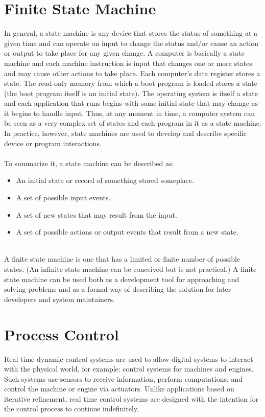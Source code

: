 \documentclass{article}
\begin{document}
\section{Finite State Machine}
In general, a state machine is any device that stores the status of something at a given time and can operate on input to change the status and/or cause an action or output to take place for any given change. A computer is basically a state machine and each machine instruction is input that changes one or more states and may cause other actions to take place. Each computer's data register stores a state. The read-only memory from which a boot program is loaded stores a state (the boot program itself is an initial state). The operating system is itself a state and each application that runs begins with some initial state that may change as it begins to handle input. Thus, at any moment in time, a computer system can be seen as a very complex set of states and each program in it as a state machine. In practice, however, state machines are used to develop and describe specific device or program interactions.\\\\


\noindent To summarize it, a state machine can be described as:
\begin{itemize}

\item An initial state or record of something stored someplace.
\item A set of possible input events.
\item A set of new states that may result from the input.
\item A set of possible actions or output events that result from a new state.\\\\

\end{itemize}

\noindent A finite state machine is one that has a limited or finite number of possible states. (An infinite state machine can be conceived but is not practical.) A finite state machine can be used both as a development tool for approaching and solving problems and as a formal way of describing the solution for later developers and system maintainers.

\newpage


\section{Process Control}
Real time dynamic control systems are used to allow digital systems to interact with the physical world, for example: control systems for machines and engines. Such systems use sensors to receive information, perform computations, and control the machine or engine via actuators. Unlike applications based on iterative refinement, real time control systems are designed with the intention for the control process to continue indefinitely.\\
\end{document}
